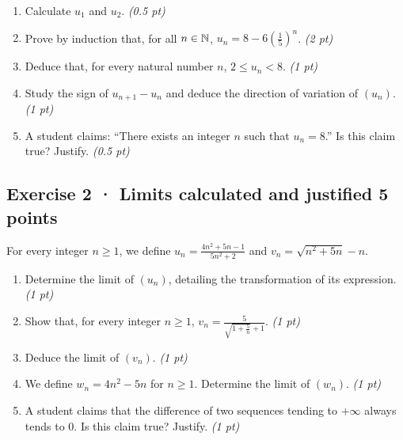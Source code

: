 \begin{enumerate}

\item Calculate $u_1$ and $u_2$. \hfill\textit{(0.5 pt)}

\item Prove by induction that, for all $n\in\mathbb N$, $u_n=8-6\left(\frac{1}{5}\right)^n$. \hfill\textit{(2 pt)}

\item Deduce that, for every natural number $n$, $2\le u_n<8$. \hfill\textit{(1 pt)}

\item Study the sign of $u_{n+1}-u_n$ and deduce the direction of variation of $(u_n)$. \hfill\textit{(1 pt)}

\item A student claims: ``There exists an integer $n$ such that $u_n=8$.'' Is this claim true? Justify. \hfill\textit{(0.5 pt)}

\end{enumerate}

\subsection*{Exercise 2 · Limits calculated and justified \hfill 5 points}For every integer $n\ge1$, we define $u_n=\frac{4n^2+5n-1}{5n^2+2}$ and $v_n=\sqrt{n^2+5n}-n$.

\begin{enumerate}

\item Determine the limit of $(u_n)$, detailing the transformation of its expression. \hfill\textit{(1 pt)}

\item Show that, for every integer $n\ge1$, $v_n=\frac{5}{\sqrt{1+\frac{5}n}+1}$. \hfill\textit{(1 pt)}

\item Deduce the limit of $(v_n)$. \hfill\textit{(1 pt)}

\item We define $w_n=4n^2-5n$ for $n\ge1$. Determine the limit of $(w_n)$. \hfill\textit{(1 pt)}

\item A student claims that the difference of two sequences tending to $+\infty$ always tends to $0$. Is this claim true? Justify. \hfill\textit{(1 pt)}

\end{enumerate}

\clearpage{}\par

